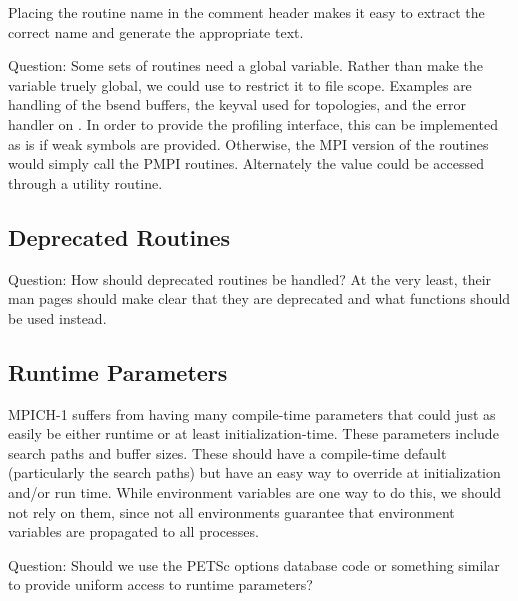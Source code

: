\documentclass{article}
\begin{document}
Placing the routine name in the comment header makes it easy to
extract the correct name and generate the appropriate text.

Question: Some sets of routines need a global variable.  Rather than
make the variable truely global, we could use  to
restrict it to file scope.   Examples are handling of the bsend
buffers, the keyval used for topologies, and the error handler on
.  In order to provide the profiling
interface, this can be implemented as is if weak symbols are
provided.  Otherwise, the MPI version of the routines would simply
call the PMPI routines.  Alternately the value could be accessed
through a utility routine.

\subsection{Deprecated Routines}
Question:  How should deprecated routines be handled?  At the very
least, their man pages should make clear that they are deprecated and
what functions should be used instead.

\subsection{Runtime Parameters}
\label{sec:runtime-params}
MPICH-1 suffers from having many compile-time parameters that could just as
easily be either runtime or at least initialization-time.  These parameters
include search paths and buffer sizes.  These should have a compile-time
default (particularly the search paths) but have an easy way to override at
initialization and/or run time.  While environment variables are one way to do
this, we should not rely on them, since not all environments guarantee that
environment variables are propagated to all processes.

Question: Should we use the PETSc options database code or something similar
to provide uniform access to runtime parameters?  
\end{document}
